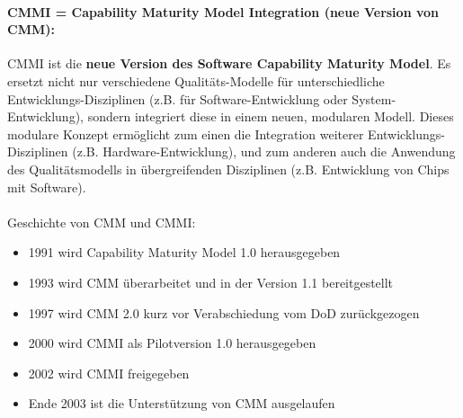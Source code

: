 \paragraph{CMMI = Capability Maturity Model Integration (neue Version von CMM):}
CMMI ist die \textbf{neue Version des Software Capability Maturity Model}. Es ersetzt nicht nur verschiedene Qualitäts-Modelle für unterschiedliche Entwicklungs-Disziplinen (z.B. für Software-Entwicklung oder System-Entwicklung), sondern integriert diese in einem neuen, modularen Modell. Dieses modulare Konzept ermöglicht zum einen die Integration weiterer Entwicklungs-Disziplinen (z.B. Hardware-Entwicklung), und zum anderen auch die Anwendung des Qualitätsmodells in übergreifenden Disziplinen (z.B. Entwicklung von Chips mit Software).
\\
\\
Geschichte von CMM und CMMI:
\begin{itemize}
	\item 1991 wird Capability Maturity Model 1.0 herausgegeben
	\item 1993 wird CMM überarbeitet und in der Version 1.1 bereitgestellt
	\item 1997 wird CMM 2.0 kurz vor Verabschiedung vom DoD zurückgezogen
	\item 2000 wird CMMI als Pilotversion 1.0 herausgegeben
	\item 2002 wird CMMI freigegeben
	\item Ende 2003 ist die Unterstützung von CMM ausgelaufen
\end{itemize}

